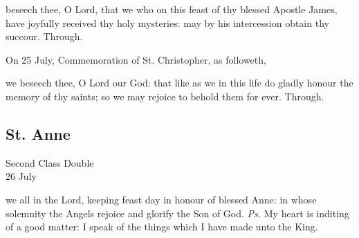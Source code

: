 \postcommunion
{} beseech thee, O Lord, that we who on this feast of thy blessed Apostle James, have joyfully received thy holy mysteries: may by his intercession obtain thy succour. Through.
\begin{rubric}
	 On 25 July, Commemoration of St. Christopher, as followeth,
\end{rubric}
 we beseech thee, O Lord our God: that like as we in this life do gladly honour the memory of thy saints; so we may rejoice to behold them for ever. Through.


\subsection{St. Anne}
\begin{inhead}
    {Second Class Double\\
26 July}
\end{inhead}


\vspace{-0.25\baselineskip}

\introit
{} we all in the Lord, keeping feast day in honour of blessed Anne: in whose solemnity the Angels rejoice and glorify the Son of God. \textit{Ps.} My heart is inditing of a good matter: I speak of the things which I have made unto the King.

\vspace{-0.25\baselineskip}

